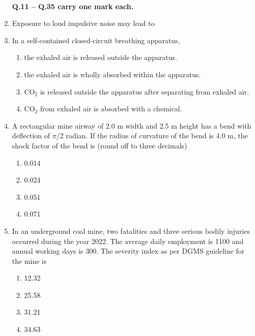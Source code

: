 \documentclass[journal]{IEEEtran}
\begin{document}
\begin{enumerate}[leftmargin=0pt]
\begin{enumerate}
\end{enumerate}
\hfill{}\\[0.5em]
\noindent\textbf{Q.11 -- Q.35 carry one mark each.}
\item Exposure to loud impulsive noise may lead to
\begin{enumerate}
\end{enumerate}
\hfill{}
\newpage
\item In a self-contained closed-circuit breathing apparatus,
\begin{enumerate}
\item the exhaled air is released outside the apparatus.
\item the exhaled air is wholly absorbed within the apparatus.
\item CO$_2$ is released outside the apparatus after separating from exhaled air.
\item CO$_2$ from exhaled air is absorbed with a chemical.
\end{enumerate}
\hfill{}
\item A rectangular mine airway of 2.0 m width and 2.5 m height has a bend with deflection of $\pi$/2 radian. If the radius of curvature of the bend is 4.0 m, the shock factor of the bend is (round off to three decimals)
\begin{enumerate}
\item 0.014
\item 0.024
\item 0.051
\item 0.071
\end{enumerate}
\hfill{}
\item In an underground coal mine, two fatalities and three serious bodily injuries occurred during the year 2022. The average daily employment is 1100 and annual working days is 300. The severity index as per DGMS guideline for the mine is
\begin{enumerate}
\item 12.32
\item 25.58
\item 31.21
\item 34.63

\end{enumerate}
\end{enumerate}
\end{document}
